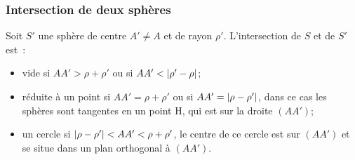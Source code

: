 \subsubsection{Intersection de deux sphères}

\begin{prop}
  Soit \(S'\) une sphère de centre \(A'\neq A\) et de rayon \(\rho'\). L'intersection de \(S\) et de \(S'\) est~:
  \begin{itemize}
  \item vide si \(AA'>\rho+\rho'\) ou si \(AA'<\left\lvert\rho'-\rho\right\rvert\);
  \item réduite à un point si \(AA'=\rho+\rho'\) ou si \(AA'=\left\lvert\rho-\rho'\right\rvert\), dans ce cas les sphères sont tangentes en un point H, qui est sur la droite \((AA')\);
  \item un cercle si \(\left\lvert\rho-\rho'\right\rvert<AA'<\rho+\rho'\), le centre de ce cercle est sur \((AA')\) et se situe dans un plan orthogonal à \((AA')\).
  \end{itemize}
\end{prop}
